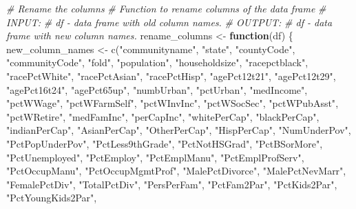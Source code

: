 \documentclass[
  11pt,
]{article}
\newenvironment{Shaded}{}{}
\newcommand{\CommentTok}[1]{\textcolor[rgb]{0.38,0.63,0.69}{\textit{#1}}}
\newcommand{\ControlFlowTok}[1]{\textcolor[rgb]{0.00,0.44,0.13}{\textbf{#1}}}
\newcommand{\FunctionTok}[1]{\textcolor[rgb]{0.02,0.16,0.49}{#1}}
\newcommand{\NormalTok}[1]{#1}
\newcommand{\OtherTok}[1]{\textcolor[rgb]{0.00,0.44,0.13}{#1}}
\newcommand{\StringTok}[1]{\textcolor[rgb]{0.25,0.44,0.63}{#1}}
\begin{document}
\begin{Shaded}
\begin{Highlighting}[]
\CommentTok{\# Rename the columns}
\CommentTok{\# Function to rename columns of the data frame}
\CommentTok{\# INPUT:}
\CommentTok{\#       df {-} data frame with old column names.}
\CommentTok{\# OUTPUT:}
\CommentTok{\#       df {-} data frame with new column names.}
\NormalTok{rename\_columns }\OtherTok{\textless{}{-}} \ControlFlowTok{function}\NormalTok{(df) \{}
\NormalTok{  new\_column\_names }\OtherTok{\textless{}{-}} \FunctionTok{c}\NormalTok{(}\StringTok{"communityname"}\NormalTok{, }\StringTok{"state"}\NormalTok{, }\StringTok{"countyCode"}\NormalTok{, }\StringTok{"communityCode"}\NormalTok{, }\StringTok{"fold"}\NormalTok{, }
                        \StringTok{"population"}\NormalTok{, }\StringTok{"householdsize"}\NormalTok{, }\StringTok{"racepctblack"}\NormalTok{, }\StringTok{"racePctWhite"}\NormalTok{, }
                        \StringTok{"racePctAsian"}\NormalTok{, }\StringTok{"racePctHisp"}\NormalTok{, }\StringTok{"agePct12t21"}\NormalTok{, }\StringTok{"agePct12t29"}\NormalTok{, }
                        \StringTok{"agePct16t24"}\NormalTok{, }\StringTok{"agePct65up"}\NormalTok{, }\StringTok{"numbUrban"}\NormalTok{, }\StringTok{"pctUrban"}\NormalTok{, }
                        \StringTok{"medIncome"}\NormalTok{, }\StringTok{"pctWWage"}\NormalTok{, }\StringTok{"pctWFarmSelf"}\NormalTok{, }\StringTok{"pctWInvInc"}\NormalTok{, }
                        \StringTok{"pctWSocSec"}\NormalTok{, }\StringTok{"pctWPubAsst"}\NormalTok{, }\StringTok{"pctWRetire"}\NormalTok{, }\StringTok{"medFamInc"}\NormalTok{, }
                        \StringTok{"perCapInc"}\NormalTok{, }\StringTok{"whitePerCap"}\NormalTok{, }\StringTok{"blackPerCap"}\NormalTok{, }\StringTok{"indianPerCap"}\NormalTok{, }
                        \StringTok{"AsianPerCap"}\NormalTok{, }\StringTok{"OtherPerCap"}\NormalTok{, }\StringTok{"HispPerCap"}\NormalTok{, }\StringTok{"NumUnderPov"}\NormalTok{, }
                        \StringTok{"PctPopUnderPov"}\NormalTok{, }\StringTok{"PctLess9thGrade"}\NormalTok{, }\StringTok{"PctNotHSGrad"}\NormalTok{, }
                        \StringTok{"PctBSorMore"}\NormalTok{, }\StringTok{"PctUnemployed"}\NormalTok{, }\StringTok{"PctEmploy"}\NormalTok{, }\StringTok{"PctEmplManu"}\NormalTok{, }
                        \StringTok{"PctEmplProfServ"}\NormalTok{, }\StringTok{"PctOccupManu"}\NormalTok{, }\StringTok{"PctOccupMgmtProf"}\NormalTok{, }
                        \StringTok{"MalePctDivorce"}\NormalTok{, }\StringTok{"MalePctNevMarr"}\NormalTok{, }\StringTok{"FemalePctDiv"}\NormalTok{, }\StringTok{"TotalPctDiv"}\NormalTok{, }
                        \StringTok{"PersPerFam"}\NormalTok{, }\StringTok{"PctFam2Par"}\NormalTok{, }\StringTok{"PctKids2Par"}\NormalTok{, }\StringTok{"PctYoungKids2Par"}\NormalTok{, }

\end{Highlighting}
\end{Shaded}
\end{document}
